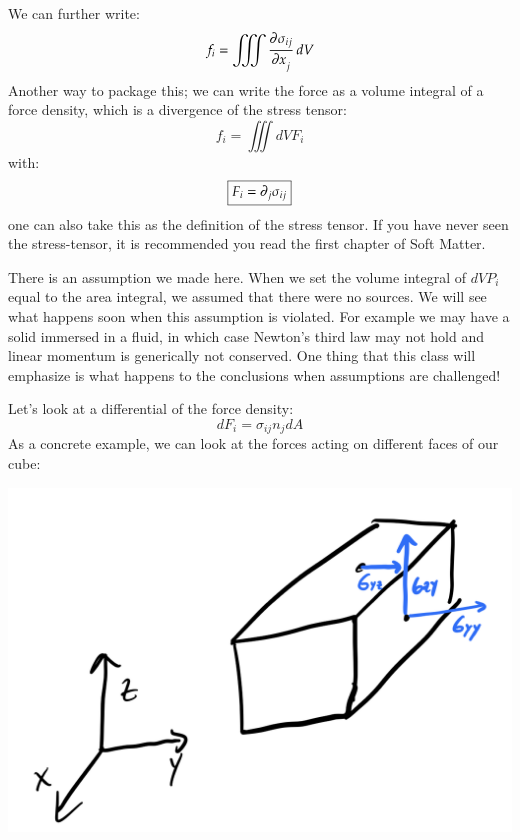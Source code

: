 We can further write:
\begin{equation}
    f_i = \iiint \dpd{\sigma_{ij}}{x_j}dV
\end{equation}
Another way to package this; we can write the force as a volume integral of a force density, which is a divergence of the stress tensor:
\begin{equation}
    f_i = \iiint dV F_i
\end{equation}
with:
\begin{equation}\label{eq:forcedensity}
    \boxed{F_i = \partial_j \sigma_{ij}}
\end{equation}
one can also take this as the definition of the stress tensor. If you have never seen the stress-tensor, it is recommended you read the first chapter of Soft Matter.

There is an assumption we made here. When we set the volume integral of $dVP_i$ equal to the area integral, we assumed that there were no sources. We will see what happens soon when this assumption is violated. For example we may have a solid immersed in a fluid, in which case Newton's third law may not hold and linear momentum is generically not conserved. One thing that this class will emphasize is what happens to the conclusions when assumptions are challenged!

Let's look at a differential of the force density:
\begin{equation}
    dF_i = \sigma_{ij}n_j dA
\end{equation}
As a concrete example, we can look at the forces acting on different faces of our cube:

\begin{center}
    \includegraphics[scale=0.35]{Lectures/Images/lec1-forces.png}
\end{center}

